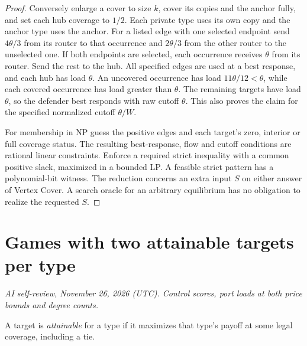 \documentclass[11pt,oneside,openany,notitlepage]{report}
\newcommand{\reviewdate}{November 26, 2026 (UTC)}
\newcommand{\reviewmark}[1]{\par\nopagebreak[4]\noindent
  {\footnotesize\itshape AI self-review, \reviewdate. #1\par}\nobreak\smallskip}
\begin{document}
\begin{proof}
Conversely enlarge a cover to size \(k\), cover its copies and the
anchor fully, and set each hub coverage to \(1/2\). Each private type
uses its own copy and the anchor type uses the anchor. For a listed edge
with one selected endpoint send \(4\theta/3\) from its router to that
occurrence and \(2\theta/3\) from the other router to the unselected
one. If both endpoints are selected, each occurrence receives \(\theta\)
from its router. Send the rest to the hub. All specified edges are used
at a best response, and each hub has load \(\theta\). An uncovered
occurrence has load \(11\theta/12<\theta\), while each covered occurrence
has load greater than \(\theta\). The remaining targets have load
\(\theta\), so the defender best responds with raw cutoff \(\theta\).
This also proves the claim for the specified normalized cutoff \(\theta/W\).

For membership in NP guess the positive edges and each target's
zero, interior or full coverage status. The resulting best-response,
flow and cutoff conditions are rational linear constraints. Enforce a
required strict inequality with a common positive slack, maximized in
a bounded LP. A feasible strict pattern has a polynomial-bit witness.
The reduction concerns an extra input \(S\) on either answer of Vertex
Cover. A search oracle for an arbitrary equilibrium has no obligation
to realize the requested \(S\).
\end{proof}

\chapter{Games with two attainable targets per type}\label{sec:sparse}
\reviewmark{Control scores, port loads at both price bounds and degree counts.}
A target is \emph{attainable} for a type if it maximizes that type's payoff
at some legal coverage, including a tie.
\end{document}
